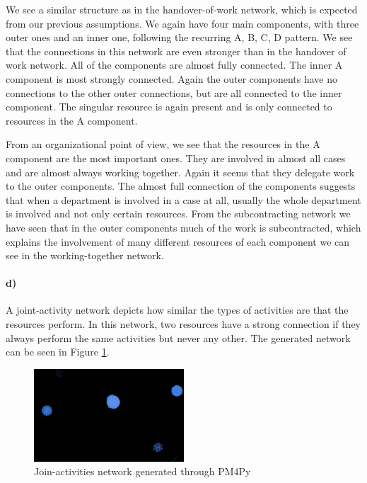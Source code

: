 \documentclass[12pt]{report}
\begin{document}
We see a similar structure as in the handover-of-work network, which is expected from our previous assumptions. We again have four main components, with three outer ones and an inner one, following the recurring A, B, C, D pattern. We see that the connections in this network are even stronger than in the handover of work network. All of the components are almost fully connected. The inner A component is most strongly connected. Again the outer components have no connections to the other outer connections, but are all connected to the inner component. The singular resource is again present and is only connected to resources in the A component.

From an organizational point of view, we see that the resources in the A component are the most important ones. They are involved in almost all cases and are almost always working together. Again it seems that they delegate work to the outer components. The almost full connection of the components suggests that when a department is involved in a case at all, usually the whole department is involved and not only certain resources. From the subcontracting network we have seen that in the outer components much of the work is subcontracted, which explains the involvement of many different resources of each component we can see in the working-together network.

\paragraph{d)} 

A joint-activity network depicts how similar the types of activities are that the resources perform. In this network, two resources have a strong connection if they always perform the same activities but never any other. The generated network can be seen in Figure \ref{fig:figures-q2_jointactivities-png}.

\begin{figure}[h]
    \centering
    \includegraphics[width=0.5\textwidth]{figures/q2_jointactivities.png}
    \caption{Join-activities network generated through PM4Py}
    \label{fig:figures-q2_jointactivities-png}
\end{figure}
\end{document}
